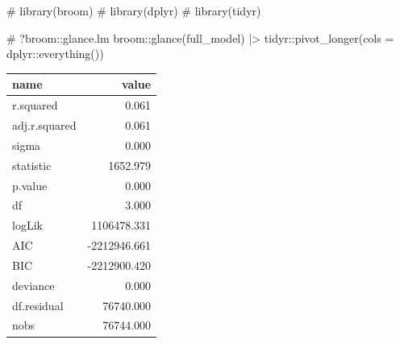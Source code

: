 \documentclass[
  12pt,
  a4paper,
  oneside]{tesesusp}
\newenvironment{Shaded}{\begin{snugshade}}{\end{snugshade}}
\newcommand{\AttributeTok}[1]{\textcolor[rgb]{0.40,0.45,0.13}{#1}}
\newcommand{\CommentTok}[1]{\textcolor[rgb]{0.37,0.37,0.37}{#1}}
\newcommand{\FunctionTok}[1]{\textcolor[rgb]{0.28,0.35,0.67}{#1}}
\newcommand{\NormalTok}[1]{\textcolor[rgb]{0.00,0.23,0.31}{#1}}
\newcommand{\SpecialCharTok}[1]{\textcolor[rgb]{0.37,0.37,0.37}{#1}}
\begin{document}
\begin{Shaded}
\begin{Highlighting}[numbers=left,,]
\CommentTok{\# library(broom)}
\CommentTok{\# library(dplyr)}
\CommentTok{\# library(tidyr)}

\CommentTok{\# ?broom::glance.lm}
\NormalTok{broom}\SpecialCharTok{::}\FunctionTok{glance}\NormalTok{(full\_model) }\SpecialCharTok{|\textgreater{}}
\NormalTok{  tidyr}\SpecialCharTok{::}\FunctionTok{pivot\_longer}\NormalTok{(}\AttributeTok{cols =}\NormalTok{ dplyr}\SpecialCharTok{::}\FunctionTok{everything}\NormalTok{())}
\end{Highlighting}
\end{Shaded}

\begin{table}
\centering
\begin{tabular}{l|r}
\hline
name & value\\
\hline
r.squared & 0.061\\
\hline
adj.r.squared & 0.061\\
\hline
sigma & 0.000\\
\hline
statistic & 1652.979\\
\hline
p.value & 0.000\\
\hline
df & 3.000\\
\hline
logLik & 1106478.331\\
\hline
AIC & -2212946.661\\
\hline
BIC & -2212900.420\\
\hline
deviance & 0.000\\
\hline
df.residual & 76740.000\\
\hline
nobs & 76744.000\\
\hline
\end{tabular}
\end{table}
\end{document}
